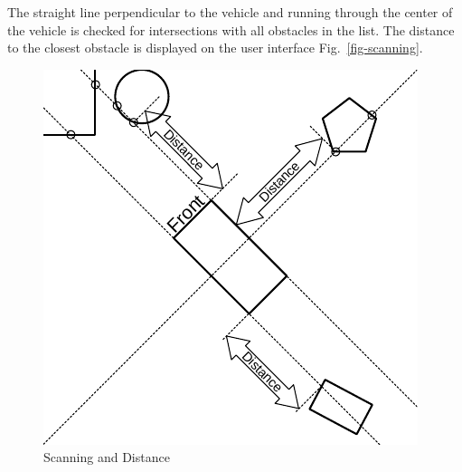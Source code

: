 \documentclass[11pt]{article}
\newcommand{\figref}[1]{Fig.~\eqref{#1}}
\begin{document}
The straight line perpendicular to the vehicle and running through the center
of the vehicle is checked for intersections with all obstacles in the list.
The distance to the closest obstacle is displayed on the user interface
\figref{fig-scanning}.

\begin{figure}
    \centering
    \includegraphics{scanning.pdf}
    \caption{Scanning and Distance}\label{fig-scanning}
\end{figure}
\end{document}
